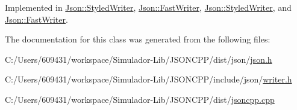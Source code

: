 Implemented in \hyperlink{class_json_1_1_styled_writer_a5efab19b9746da9920c29cdae3a6b404}{Json\+::\+Styled\+Writer}, \hyperlink{class_json_1_1_fast_writer_a93d45ba4bc312371d08beb3e3dfbe654}{Json\+::\+Fast\+Writer}, \hyperlink{class_json_1_1_styled_writer_a5efab19b9746da9920c29cdae3a6b404}{Json\+::\+Styled\+Writer}, and \hyperlink{class_json_1_1_fast_writer_a93d45ba4bc312371d08beb3e3dfbe654}{Json\+::\+Fast\+Writer}.



The documentation for this class was generated from the following files\+:\begin{DoxyCompactItemize}
\item 
C\+:/\+Users/609431/workspace/\+Simulador-\/\+Lib/\+J\+S\+O\+N\+C\+P\+P/dist/json/\hyperlink{dist_2json_2json_8h}{json.\+h}\item 
C\+:/\+Users/609431/workspace/\+Simulador-\/\+Lib/\+J\+S\+O\+N\+C\+P\+P/include/json/\hyperlink{writer_8h}{writer.\+h}\item 
C\+:/\+Users/609431/workspace/\+Simulador-\/\+Lib/\+J\+S\+O\+N\+C\+P\+P/dist/\hyperlink{jsoncpp_8cpp}{jsoncpp.\+cpp}\end{DoxyCompactItemize}
